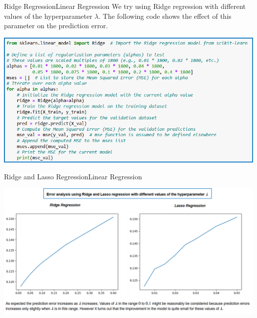 \documentclass[11pt]{beamer}
\begin{document}
\begin{frame}{Ridge Regression}{Linear Regression}
We try using Ridge regression with different values of the hyperparameter $\lambda$. The following code shows the effect of this parameter on the prediction error. 
	\begin{center}
	\includegraphics[scale=.45]{../05-pictures/lesson-3-1_pic_4.png}
	\end{center}
\end{frame}
\begin{frame}{Ridge and Lasso Regression}{Linear Regression}
	\begin{center}
	\includegraphics[scale=.38]{../05-pictures/lesson-3-1_pic_5.png}
	\end{center}
\end{frame}
\end{document}

